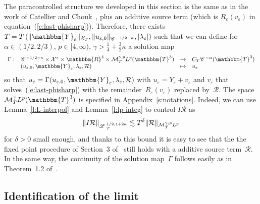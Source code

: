 \begin{remark}
  \label{r:solmap-cont} The paracontrolled structure we developed in this
  section is the same as in the work of Catellier and
  Chouk~{\cite{catellier_paracontrolled_2013}}, plus an additive source term
  (which is $R_{\varepsilon} (v_{\varepsilon})$ in
  equation~(\ref{e:last-phisharp})). Therefore, there exists $T = T \left( \|
  \mathbbm{Y}_{\varepsilon} \|_{\mathcal{X}_T}, \| u_{\varepsilon, 0}
  \|_{\CC^{- 1 / 2 - \kappa}}, | \lambda_{\varepsilon} | \right)$ such that we
  can define for $\alpha \in (1 / 2, 2 / 3)$, $p \in [4, \infty)$, $\gamma >
  \frac{1}{4} + \frac{3}{2} \kappa$ a solution map
  \[ \begin{array}{llll}
       \Gamma : & \CC^{- 1 / 2 - \kappa} \times \mathcal{X}^{\tau} \times
       \mathbbm{R}^4 \times \mathcal{M}^{\gamma, p}_T L^p (\mathbbm{T}^3) &
       \rightarrow & C_T \CC^{- \alpha} (\mathbbm{T}^3)\\
       & (u_{\varepsilon, 0}, \mathbbm{Y}_{\varepsilon},
       \lambda_{\varepsilon}, \mathcal{R}) & \mapsto & u_{\varepsilon}
     \end{array} \]
  so that $u_{\varepsilon} = \Gamma (u_{\varepsilon, 0},
  \mathbbm{Y}_{\varepsilon}, \lambda_{\varepsilon}, \mathcal{R})$ with
  $u_{\varepsilon} = Y_{\varepsilon} + v_{\varepsilon}$ and $v_{\varepsilon}$
  that solves~(\ref{e:last-phisharp}) with the remainder~$R_{\varepsilon}
  (v_{\varepsilon})$ replaced by~$\mathcal{R}$. The space
  $\mathcal{M}^{\gamma}_T L^p (\mathbbm{T}^3)$ is specified in
  Appendix~\ref{s:notations}. Indeed, we can use Lemma~\ref{l:L-interpol} and
  Lemma~\ref{l:lp-integ} to control $I\mathcal{R}$ as
  \[ \|I\mathcal{R}\|_{\mathscr{L} \hspace{.2em}^{1 / 2, 1 + 2 \kappa}_T} \lesssim T^{\delta} \|
     \mathcal{R} \|_{\mathcal{M}^{\gamma, p}_T L^p} \]
  for $\delta > 0$ small enough, and thanks to this bound it is easy to see
  that the the fixed point procedure of Section~3
  of~{\cite{catellier_paracontrolled_2013}} still holds with a
   additive source term~$\mathcal{R}$. In the same way, the
  continuity of the solution map~$\Gamma$ follows easily as in Theorem~1.2
  of~{\cite{catellier_paracontrolled_2013}}. 
\end{remark}

\subsection{Identification of the limit}\label{s:limit-ident}

